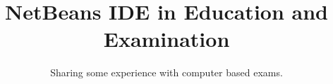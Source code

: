 \title{NetBeans IDE in Education and Examination}
\subtitle{Sharing some experience with computer based exams.}
